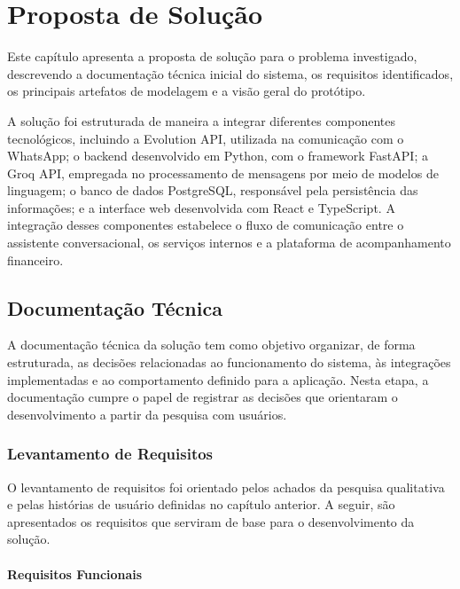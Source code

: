 \chapter{Proposta de Solução}
\label{cap:solucao}

Este capítulo apresenta a proposta de solução para o problema investigado, descrevendo a documentação técnica inicial do sistema, os requisitos identificados, os principais artefatos de modelagem e a visão geral do protótipo.

A solução foi estruturada de maneira a integrar diferentes componentes tecnológicos, incluindo a Evolution API, utilizada na comunicação com o WhatsApp; o backend desenvolvido em Python, com o framework FastAPI; a Groq API, empregada no processamento de mensagens por meio de modelos de linguagem; o banco de dados PostgreSQL, responsável pela persistência das informações; e a interface web desenvolvida com React e TypeScript. A integração desses componentes estabelece o fluxo de comunicação entre o assistente conversacional, os serviços internos e a plataforma de acompanhamento financeiro.

\section{Documentação Técnica}

A documentação técnica da solução tem como objetivo organizar, de forma estruturada, as decisões relacionadas ao funcionamento do sistema, às integrações implementadas e ao comportamento definido para a aplicação. Nesta etapa, a documentação cumpre o papel de registrar as decisões que orientaram o desenvolvimento a partir da pesquisa com usuários.

\subsection{Levantamento de Requisitos}

O levantamento de requisitos foi orientado pelos achados da pesquisa qualitativa e pelas histórias de usuário definidas no capítulo anterior. A seguir, são apresentados os requisitos que serviram de base para o desenvolvimento da solução.

\subsubsection{Requisitos Funcionais}

